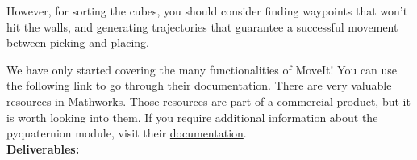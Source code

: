 \documentclass[12pt]{article}
\begin{document}
However, for sorting the cubes, you should consider finding waypoints that won't hit the walls, and generating trajectories that guarantee a successful movement between picking and placing.


We have only started covering the many functionalities of MoveIt! You can use the following \hyperlink{http://docs.ros.org/en/melodic/api/moveit_tutorials/html/doc/quickstart_in_rviz/quickstart_in_rviz_tutorial.html}{link} to go through their documentation.
There are very valuable resources in \hyperlink{https://www.mathworks.com/videos/trajectory-planning-for-robot-manipulators-1556705635398.html}{Mathworks}. Those resources are part of a commercial product, but it is worth looking into them.
If you require additional information about the pyquaternion module, visit their \hyperlink{http://kieranwynn.github.io/pyquaternion/}{documentation}.\\

\textbf{Deliverables:}
\end{document}

